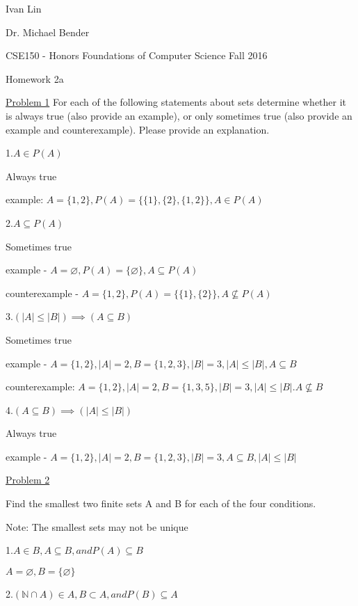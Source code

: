 \documentclass{article}
\begin{document}
Ivan Lin

Dr. Michael Bender

CSE150 - Honors Foundations of Computer Science Fall 2016

\begin{center}
Homework 2a
\end{center}
\underline{Problem 1}
For each of the following statements about sets determine whether it is always true (also provide an
example), or only sometimes true (also provide an example and counterexample). Please provide
an explanation.\newline

1.$A \in P(A)$

Always true

example: $A = \{1,2\}, P(A) = \{\{1\},\{2\},\{1,2\}\}, A \in P(A)$\newline

2.$A \subseteq P(A)$

Sometimes true 

example - $A = \varnothing, P(A) = \{\varnothing\}, A \subseteq P(A)$

counterexample - $A = \{1,2\}, P(A) = \{\{1\},\{2\}\}, A \not\subseteq P(A)$\newline

3.$(|A| \leq |B|) \implies (A \subseteq B)$

Sometimes true

example - $A = \{1,2\}, |A| = 2, B = \{1,2,3\}, |B| = 3, |A| \leq |B|, A \subseteq B$

counterexample: $A = \{1,2\}, |A| = 2, B = \{1,3,5\}, |B| = 3, |A| \leq |B|. A \not\subseteq B$\newline

4.$(A \subseteq B) \implies (|A| \leq |B|)$

Always true

example - $A = \{1,2\}, |A| = 2, B = \{1,2,3\}, |B| = 3, A \subseteq B, |A| \leq |B|$\newline

\underline{Problem 2}

Find the smallest two finite sets A and B for each of the four conditions.

Note: The smallest sets may not be unique

1.$A \in B, A \subseteq B, and P(A) \subseteq B$

$A = \varnothing, B = \{\varnothing\}$\newline

2.$(\mathbb{N} \cap A) \in A, B \subset A, and P(B) \subseteq A$
\end{document}
